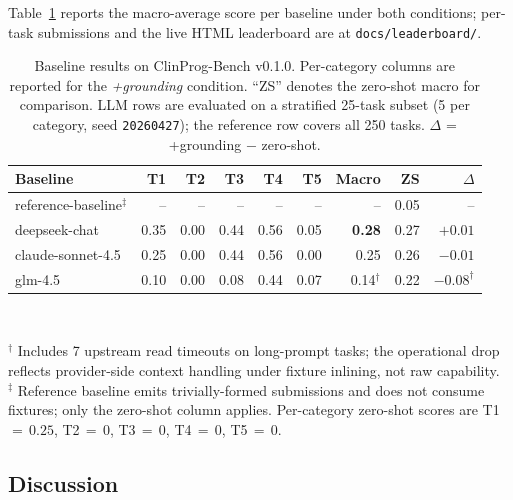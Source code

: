 Table~\ref{tab:baselines} reports the macro-average score per baseline
under both conditions; per-task submissions and the live HTML
leaderboard are at \texttt{docs/leaderboard/}.

\begin{table}[h]
\centering
\small
\caption{Baseline results on ClinProg-Bench v0.1.0. Per-category columns
are reported for the \emph{+grounding} condition. ``ZS'' denotes the
zero-shot macro for comparison. LLM rows are evaluated on a stratified
25-task subset (5 per category, seed \texttt{20260427}); the reference
row covers all 250 tasks. $\Delta$ = +grounding $-$ zero-shot.}
\label{tab:baselines}
\begin{tabular}{lrrrrrrrr}
\toprule
Baseline & T1 & T2 & T3 & T4 & T5 & Macro & ZS & $\Delta$ \\
\midrule
reference-baseline$^\ddagger$ & --   & --   & --   & --   & --   & --            & 0.05 & --     \\
deepseek-chat         & 0.35 & 0.00 & 0.44 & 0.56 & 0.05 & \textbf{0.28} & 0.27 & $+0.01$ \\
claude-sonnet-4.5     & 0.25 & 0.00 & 0.44 & 0.56 & 0.00 & 0.25          & 0.26 & $-0.01$ \\
glm-4.5               & 0.10 & 0.00 & 0.08 & 0.44 & 0.07 & 0.14$^\dagger$ & 0.22 & $-0.08^\dagger$ \\
\bottomrule
\end{tabular}\\
\smallskip
\raggedright\footnotesize{$^\dagger$ Includes 7 upstream read timeouts on
long-prompt tasks; the operational drop reflects provider-side context
handling under fixture inlining, not raw capability.\\
$^\ddagger$ Reference baseline emits trivially-formed submissions and
does not consume fixtures; only the zero-shot column applies.
Per-category zero-shot scores are
T1\,$=\,0.25$, T2\,$=\,0$, T3\,$=\,0$, T4\,$=\,0$, T5\,$=\,0$.}
\end{table}

\subsection{Discussion}


